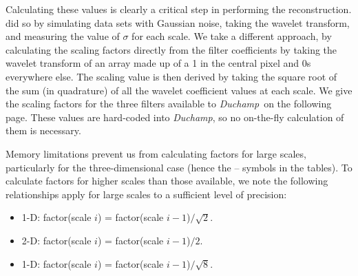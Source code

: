 \documentclass[12pt,a4paper]{article}
\newcommand{\duchamp}{\emph{Duchamp}}
\begin{document}
Calculating these values is clearly a critical step in performing the
reconstruction. \citet{starck02:book} did so by simulating data sets
with Gaussian noise, taking the wavelet transform, and measuring the
value of $\sigma$ for each scale. We take a different approach, by
calculating the scaling factors directly from the filter coefficients
by taking the wavelet transform of an array made up of a 1 in the
central pixel and 0s everywhere else. The scaling value is then
derived by taking the square root of the sum (in quadrature) of all
the wavelet coefficient values at each scale. We give the scaling
factors for the three filters available to \duchamp\ on the following
page. These values are hard-coded into \duchamp, so no on-the-fly
calculation of them is necessary.

Memory limitations prevent us from calculating factors for large
scales, particularly for the three-dimensional case (hence the --
symbols in the tables). To calculate factors for
higher scales than those available, we note the following
relationships apply for large scales to a sufficient level of precision:
\begin{itemize}
\item 1-D: factor(scale $i$) = factor(scale $i-1$)$/\sqrt{2}$.
\item 2-D: factor(scale $i$) = factor(scale $i-1$)$/2$.
\item 1-D: factor(scale $i$) = factor(scale $i-1$)$/\sqrt{8}$.
\end{itemize}
\end{document}
